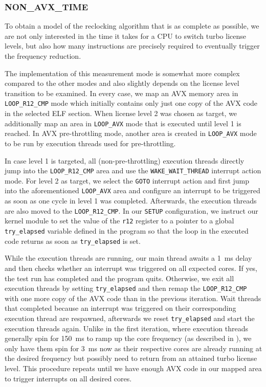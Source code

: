 \subsubsection{NON\_AVX\_TIME}
\label{sec:analysis:design:measurementmodes:nonavxtime}

To obtain a model of the reclocking algorithm that is as complete as possible, we are not only interested in the time it takes for a \gls{CPU} to switch turbo license levels, but also how many instructions are precisely required to eventually trigger the frequency reduction.

The implementation of this measurement mode is somewhat more complex compared to the other modes and also slightly depends on the license level transition to be examined. In every case, we map an \gls{AVX} memory area in \texttt{LOOP\_R12\_CMP} mode which initially contains only just one copy of the \gls{AVX} code in the selected \gls{ELF} section. When license level 2 was chosen as target, we additionally map an area in \texttt{LOOP\_AVX} mode that is executed until level 1 is reached. In \gls{AVX} pre-throttling mode, another area is created in \texttt{LOOP\_AVX} mode to be run by execution threads used for pre-throttling.

In case level 1 is targeted, all (non-pre-throttling) execution threads directly jump into the \texttt{LOOP\_R12\_CMP} area and use the \texttt{WAKE\_WAIT\_THREAD} interrupt action mode. For level 2 as target, we select the \texttt{GOTO} interrupt action and first jump into the aforementioned \texttt{LOOP\_AVX} area and configure an interrupt to be triggered as soon as one cycle in level 1 was completed. Afterwards, the execution threads are also moved to the \texttt{LOOP\_R12\_CMP}. In our \texttt{SETUP} configuration, we instruct our kernel module to set the value of the \texttt{r12} register to a pointer to a global \texttt{try\_elapsed} variable defined in the program so that the loop in the executed code returns as soon as \texttt{try\_elapsed} is set.

While the execution threads are running, our main thread awaits a \SI{1}{\milli\second} delay and then checks whether an interrupt was triggered on all expected cores. If yes, the test run has completed and the program quits. Otherwise, we exit all execution threads by setting \texttt{try\_elapsed} and then remap the \texttt{LOOP\_R12\_CMP} with one more copy of the \gls{AVX} code than in the previous iteration. Wait threads that completed because an interrupt was triggered on their corresponding execution thread are respawned, afterwards we reset \texttt{try\_elapsed} and start the execution threads again. Unlike in the first iteration, where execution threads generally spin for \SI{150}{\milli\second} to ramp up the core frequency (as described in ), we only have them spin for \SI{3}{\milli\second} now as their respective cores are already running at the desired frequency but possibly need to return from an attained turbo license level. This procedure repeats until we have enough \gls{AVX} code in our mapped area to trigger interrupts on all desired cores.

